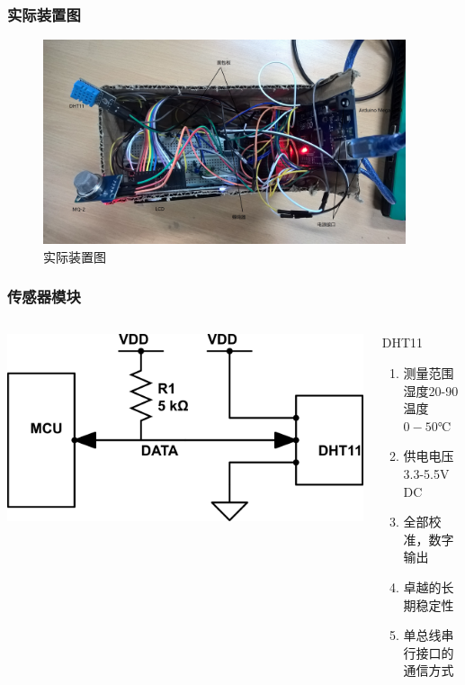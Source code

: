 ﻿\documentclass{beamer}
\begin{document}
\begin{frame}
\frametitle{实际装置图}
\begin{figure}
\centering
    \includegraphics[height=6cm]{./img/wp}
\caption{实际装置图}
  \label{fig:visual}
\end{figure}
\end{frame}

\begin{frame}
\frametitle{传感器模块}
\begin{columns}
\begin{column}{0.50\textwidth}
\includegraphics[width=\textwidth]{./img/dht11}
\end{column}
\begin{column}{0.50\textwidth}
\begin{block}{DHT11}
\begin{enumerate}
\item 测量范围湿度20-90%
温度$0-50℃$
\item 供电电压 3.3-5.5V DC
\item 全部校准，数字输出
\item 卓越的长期稳定性
\item 单总线串行接口的通信方式
\end{enumerate}
\end{block}
\end{column}
\end{columns}
\end{frame}
\end{document}
